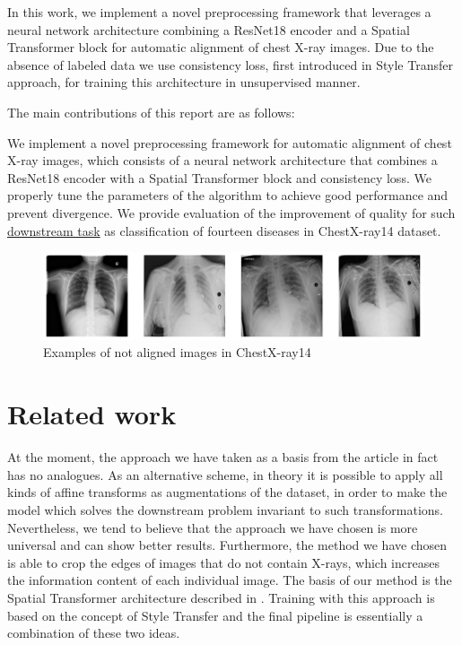\documentclass{article}
\begin{document}
In this work, we implement a novel preprocessing framework that leverages a 
 neural network architecture combining a ResNet18 encoder and a Spatial 
 Transformer block for automatic alignment of chest X-ray images. Due to the 
 absence of labeled data we use consistency loss, first introduced in Style 
 Transfer approach, for training this architecture in unsupervised manner.

The main contributions of this report are as follows:

We implement a novel preprocessing framework for automatic alignment of chest
 X-ray images, which consists of a neural network architecture that combines 
 a ResNet18 encoder with a Spatial Transformer block and consistency loss. 
We properly tune the parameters of the algorithm to achieve good performance
 and prevent divergence.
We provide evaluation of the improvement of quality for such 
 \href{https://paperswithcode.com/sota/multi-label-classification-on-chestx-ray14}{downstream task}
 as classification of fourteen diseases in ChestX-ray14 dataset.

\begin{figure}[ht]\label{initial_images}
    \vskip 0.2in
    \begin{center}
    \centerline{\includegraphics[width=\columnwidth]{../images/initial_images.png}}
    \caption{Examples of not aligned images in ChestX-ray14}
    \end{center}
    \vskip -0.2in
\end{figure}

\section{Related work}\label{related_work}

At the moment, the approach we have taken as a basis from the article \cite{XRayDiagnosis}
 in fact has no analogues. As an alternative scheme, in theory it is 
 possible to apply all kinds of affine transforms as augmentations of the dataset, 
 in order to make the model which solves the downstream problem invariant to such 
 transformations. Nevertheless, we tend to believe that the approach we have chosen 
 is more universal and can show better results. Furthermore, the method we have 
 chosen is able to crop the edges of images that do not contain X-rays, which 
 increases the information content of each individual image. The basis of our 
 method is the Spatial Transformer architecture described in \cite{SpatialTransform}. 
 Training with this approach is based on the concept of Style Transfer \cite{StyleTransfer} and 
 the final pipeline is essentially a combination of these two ideas.
\end{document}

